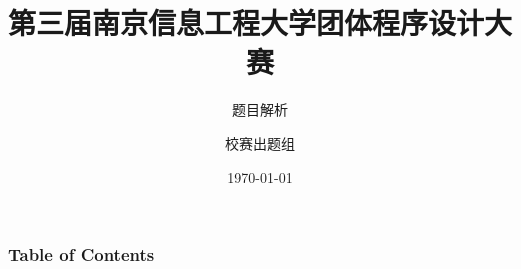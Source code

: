 \documentclass[UTF8]{ctexbeamer}
\title{第三届南京信息工程大学团体程序设计大赛}
\subtitle{题目解析}
\author{校赛出题组}
\institute{ThinkSpirit}
\date{\today}
\begin{document}
\frame{\titlepage}
\begin{frame}
    \frametitle{Table of Contents}
    \begin{multicols}{2}
    \tableofcontents
    \end{multicols}
\end{frame}















\end{document}
